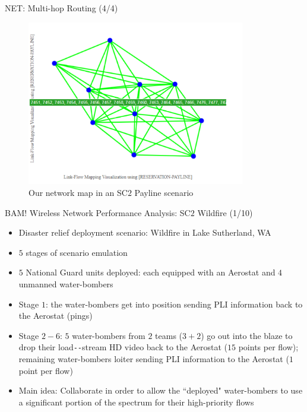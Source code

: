 \documentclass{beamer}
\begin{document}
\begin{frame}{NET: Multi-hop Routing (4/4)}
\begin{figure}
    \centering
    \includegraphics[width = 0.85\textwidth]{Network_Graph_Payline.PNG}
    \caption{Our network map in an SC$2$ Payline scenario}
    \label{fig:19}
\end{figure}
\end{frame}
\begin{frame}{BAM! Wireless Network Performance Analysis: SC$2$ Wildfire (1/10)}
    \footnotesize{\begin{itemize}
        \item Disaster relief deployment scenario: Wildfire in Lake Sutherland, WA
        \item $5$ stages of scenario emulation
        \item $5$ National Guard units deployed: each equipped with an Aerostat and $4$ unmanned water-bombers
        \item Stage $1$: the water-bombers get into position sending PLI information back to the Aerostat (pings)
        \item Stage $2{-}6$: $5$ water-bombers from $2$ teams ($3{+}2$) go out into the blaze to drop their load\texttt{-{}-}stream HD video back to the Aerostat ($15$ points per flow); remaining water-bombers loiter sending PLI information to the Aerostat ($1$ point per flow)
        \item Main idea: Collaborate in order to allow the ``deployed" water-bombers to use a significant portion of the spectrum for their high-priority flows
    \end{itemize}}
\end{frame}
\end{document}
